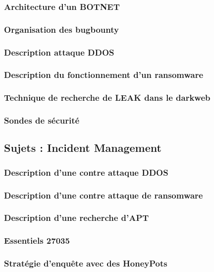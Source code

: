 \subsubsection{Architecture d'un BOTNET}
\subsubsection{Organisation des bugbounty}
\subsubsection{Description attaque DDOS}
\subsubsection{Description du fonctionnement d'un ransomware}
\subsubsection{Technique de recherche de LEAK dans le darkweb}

\subsubsection{Sondes de sécurité}

\subsection{Sujets : Incident Management}
\subsubsection{Description d'une contre attaque DDOS}
\subsubsection{Description d'une  contre attaque de ransomware} 
\subsubsection{Description d'une recherche d'APT}
\subsubsection{Essentiels 27035}

\subsubsection{Stratégie d'enquête avec des HoneyPots}

